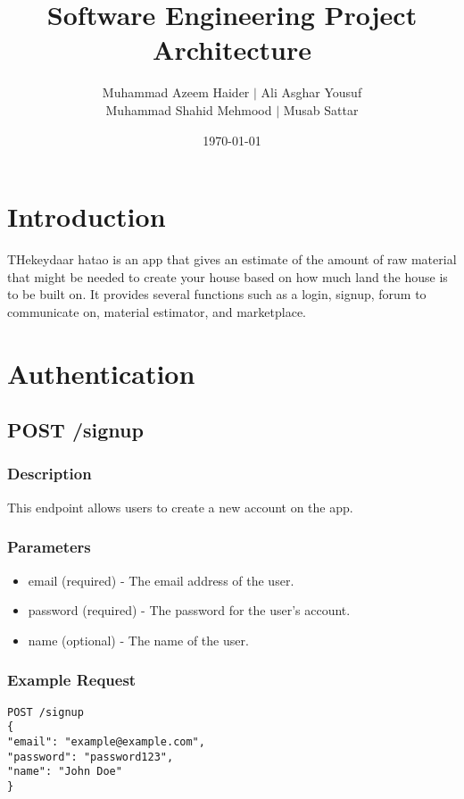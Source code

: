 \documentclass{article}
\title{Software Engineering Project Architecture}
\author{Muhammad Azeem Haider $\mid$ Ali Asghar Yousuf \\
      Muhammad Shahid Mehmood $\mid$ Musab Sattar}
\date{\today}
\begin{document}
\maketitle

\section{Introduction}

THekeydaar hatao is an app that gives an estimate of the amount of raw material that might be needed to create your house based on how much land the house is to be built on. It provides several functions such as a login, signup, forum to communicate on, material estimator, and marketplace.

\section{Authentication}

\subsection{POST /signup}

\subsubsection{Description}

This endpoint allows users to create a new account on the app.

\subsubsection{Parameters}

\begin{itemize}
\item email (required) - The email address of the user.
\item password (required) - The password for the user's account.
\item name (optional) - The name of the user.
\end{itemize}

\subsubsection{Example Request}

\begin{verbatim}
POST /signup
{
"email": "example@example.com",
"password": "password123",
"name": "John Doe"
}
\end{verbatim}
\end{document}

